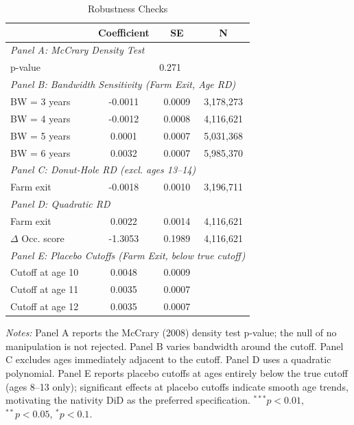 \begin{table}[t]
\centering
\begin{threeparttable}
\caption{Robustness Checks}
\label{tab:robustness}
\begin{tabular}{lccc}
\hline\hline
 & Coefficient & SE & N \\
\hline
\multicolumn{4}{l}{\textit{Panel A: McCrary Density Test}} \\
p-value & \multicolumn{3}{c}{0.271} \\
\hline
\multicolumn{4}{l}{\textit{Panel B: Bandwidth Sensitivity (Farm Exit, Age RD)}} \\
BW = 3 years & -0.0011 & 0.0009 & 3,178,273 \\
BW = 4 years & -0.0012 & 0.0008 & 4,116,621 \\
BW = 5 years & 0.0001 & 0.0007 & 5,031,368 \\
BW = 6 years & 0.0032 & 0.0007 & 5,985,370 \\
\hline
\multicolumn{4}{l}{\textit{Panel C: Donut-Hole RD (excl. ages 13--14)}} \\
Farm exit & -0.0018 & 0.0010 & 3,196,711 \\
\hline
\multicolumn{4}{l}{\textit{Panel D: Quadratic RD}} \\
Farm exit & 0.0022 & 0.0014 & 4,116,621 \\
$\Delta$ Occ. score & -1.3053 & 0.1989 & 4,116,621 \\
\hline
\multicolumn{4}{l}{\textit{Panel E: Placebo Cutoffs (Farm Exit, below true cutoff)}} \\
Cutoff at age 10 & 0.0048 & 0.0009 & \\
Cutoff at age 11 & 0.0035 & 0.0007 & \\
Cutoff at age 12 & 0.0035 & 0.0007 & \\
\hline\hline
\end{tabular}
\begin{tablenotes}[flushleft]\small
\item \textit{Notes:} Panel A reports the McCrary (2008) density test p-value; the null of no manipulation is not rejected. Panel B varies bandwidth around the cutoff. Panel C excludes ages immediately adjacent to the cutoff. Panel D uses a quadratic polynomial. Panel E reports placebo cutoffs at ages entirely below the true cutoff (ages 8--13 only); significant effects at placebo cutoffs indicate smooth age trends, motivating the nativity DiD as the preferred specification. $^{***}p<0.01$, $^{**}p<0.05$, $^{*}p<0.1$.
\end{tablenotes}
\end{threeparttable}
\end{table}

